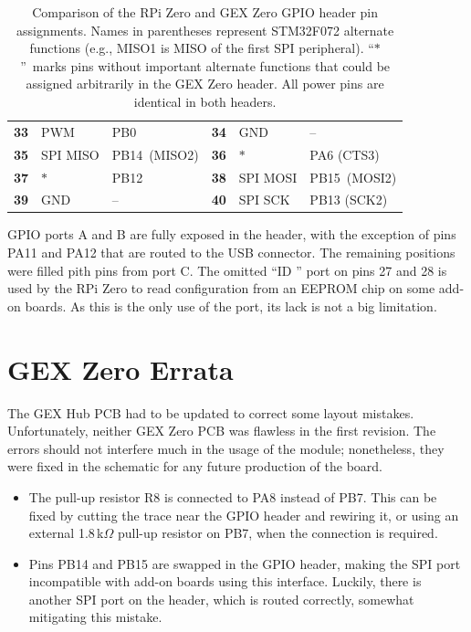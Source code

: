 \begin{table}
\begin{tabularx}{\textwidth}{W{.1\textwidth}XX|W{.1\textwidth}XX}
		\midrule
		\textbf{33} & PWM & PB0 
		& \textbf{34} & \leavevmode\color{blue}GND & -- \\
		\textbf{35} & SPI MISO & PB14~(MISO2)
		& \textbf{36} &  $\ast$ & PA6 (CTS3) \\
		\textbf{37} & $\ast$ & PB12
		& \textbf{38} & SPI MOSI & PB15~(MOSI2)\\
		\textbf{39} & \leavevmode\color{blue}GND & -- 
		& \textbf{40} & SPI SCK & PB13 (SCK2)\\
		\bottomrule 
	\end{tabularx}
	\caption[Comparison of the RPI Zero and GEX Zero GPIO headers]{\label{tbl:gz_rpi_compare}
		Comparison of the RPi Zero and GEX Zero GPIO header pin assignments. Names in parentheses represent STM32F072 alternate functions (e.g., MISO1 is MISO of the first SPI peripheral). ``$\ast$''~marks pins without important alternate functions that could be assigned arbitrarily in the GEX Zero header. All power pins are identical in both headers.
	}
\end{table}

\gls{GPIO} ports A and B are fully exposed in the header, with the exception of pins PA11 and PA12 that are routed to the USB connector. The remaining positions were filled pith pins from port C. The omitted ``ID \IIC'' port on pins 27 and 28 is used by the RPi Zero to read configuration from an EEPROM chip on some add-on boards. As this is the only use of the \IIC port, its lack is not a big limitation.

\section{GEX Zero Errata}

The GEX Hub \gls{PCB} had to be updated to correct some layout mistakes.
Unfortunately, neither GEX Zero \gls{PCB} was flawless in the first revision. The errors should not interfere much in the usage of the module; nonetheless, they were fixed in the schematic for any future production of the board.

\begin{itemize}
	\item The \IIC pull-up resistor R8 is connected to PA8 instead of PB7. This can be fixed by cutting the trace near the \gls{GPIO} header and rewiring it, or using an external 1.8\,k$\Omega$ pull-up resistor on PB7, when the \IIC connection is required.
	\item Pins PB14 and PB15 are swapped in the \gls{GPIO} header, making the SPI port incompatible with add-on boards using this interface. Luckily, there is another SPI port on the header, which is routed correctly, somewhat mitigating this mistake.
\end{itemize}

